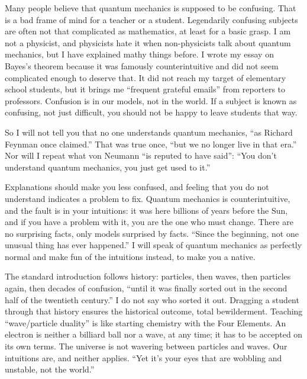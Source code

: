 
Many people believe that quantum mechanics is supposed to be confusing. That is a bad frame of mind for a teacher or a student. Legendarily confusing subjects are often not that complicated as mathematics, at least for a basic grasp. I am not a physicist, and physicists hate it when non-physicists talk about quantum mechanics, but I have explained mathy things before. I wrote my essay on Bayes's theorem because it was famously counterintuitive and did not seem complicated enough to deserve that. It did not reach my target of elementary school students, but it brings me ``frequent grateful emails'' from reporters to professors. Confusion is in our models, not in the world. If a subject is known as confusing, not just difficult, you should not be happy to leave students that way.

So I will not tell you that no one understands quantum mechanics, ``as Richard Feynman once claimed.'' That was true once, ``but we no longer live in that era.''  Nor will I repeat what von Neumann ``is reputed to have said'': ``You don't understand quantum mechanics, you just get used to it.'' 

Explanations should make you less confused, and feeling that you do not understand indicates a problem to fix. Quantum mechanics is counterintuitive, and the fault is in your intuitions: it was here billions of years before the Sun, and if you have a problem with it, you are the one who must change. There are no surprising facts, only models surprised by facts. ``Since the beginning, not one unusual thing has ever happened.'' I will speak of quantum mechanics as perfectly normal and make fun of the intuitions instead, to make you a native.

The standard introduction follows history: particles, then waves, then particles again, then decades of confusion, ``until it was finally sorted out in the second half of the twentieth century.'' I do not say who sorted it out.  Dragging a student through that history ensures the historical outcome, total bewilderment. Teaching ``wave/particle duality'' is like starting chemistry with the Four Elements. An electron is neither a billiard ball nor a wave, at any time; it has to be accepted on its own terms. The universe is not wavering between particles and waves. Our intuitions are, and neither applies. ``Yet it's your eyes that are wobbling and unstable, not the world.''

